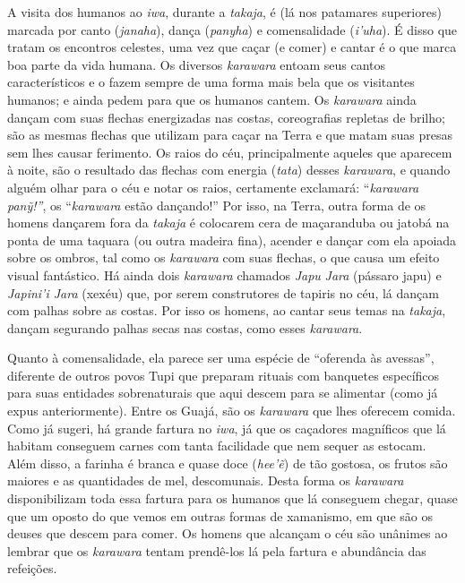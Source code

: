 A visita dos humanos ao \emph{iwa}, durante a \emph{takaja}, é (lá nos
patamares superiores) marcada por canto (\emph{janaha}), dança
(\emph{panyha}) e comensalidade (\emph{i'uha}). É disso que tratam os
encontros celestes, uma vez que caçar (e comer) e cantar é o que marca
boa parte da vida humana. Os diversos \emph{karawara} entoam seus cantos
característicos e o fazem sempre de uma forma mais bela que os
visitantes humanos; e ainda pedem para que os humanos cantem. Os
\emph{karawara} ainda dançam com suas flechas energizadas nas costas,
coreografias repletas de brilho; são as mesmas flechas que utilizam para
caçar na Terra e que matam suas presas sem lhes causar ferimento. Os
raios do céu, principalmente aqueles que aparecem à noite, são o
resultado das flechas com energia (\emph{tata}) desses \emph{karawara},
e quando alguém olhar para o céu e notar os raios, certamente exclamará:
``\emph{karawara} \emph{panỹ!''}, os ``\emph{karawara} estão dançando!'' Por
isso, na Terra, outra forma de os homens dançarem fora da \emph{takaja}
é colocarem cera de maçaranduba ou jatobá na ponta de uma taquara (ou
outra madeira fina), acender e dançar com ela apoiada sobre os ombros,
tal como os \emph{karawara} com suas flechas, o que causa um efeito
visual fantástico. Há ainda dois \emph{karawara} chamados \emph{Japu}
\emph{Jara} (pássaro japu) e \emph{Japini'i Jara} (xexéu) que, por serem
construtores de tapiris no céu, lá dançam com palhas sobre as costas.
Por isso os homens, ao cantar seus temas na \emph{takaja}, dançam
segurando palhas secas nas costas, como esses \emph{karawara}.

Quanto à comensalidade, ela parece ser uma espécie de ``oferenda às
avessas'', diferente de outros povos Tupi que preparam rituais com
banquetes específicos para suas entidades sobrenaturais que aqui descem
para se alimentar (como já expus anteriormente). Entre os Guajá, são os
\emph{karawara} que lhes oferecem comida. Como já sugeri, há grande
fartura no \emph{iwa}, já que os caçadores magníficos que lá habitam
conseguem carnes com tanta facilidade que nem sequer as estocam. Além
disso, a farinha é branca e quase doce (\emph{hee'ẽ}) de tão gostosa, os
frutos são maiores e as quantidades de mel, descomunais. Desta forma os
\emph{karawara} disponibilizam toda essa fartura para os humanos que lá
conseguem chegar, quase que um oposto do que vemos em outras formas de
xamanismo, em que são os deuses que descem para comer. Os homens que
alcançam o céu são unânimes ao lembrar que os \emph{karawara} tentam
prendê-los lá pela fartura e abundância das refeições.

